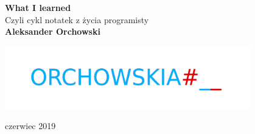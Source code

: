 	\begin{titlepage}
		\begin{center}
			\vspace*{1cm}
{\Huge
			\textbf{What I learned}\\
}			
			\vspace{0.5cm}
{\huge
			Czyli cykl notatek z życia programisty	\\		
}			
			\fontsize{11}{0}
 			\vspace{1.5cm}
{\large
			\textbf{Aleksander Orchowski}
}\\
			\vfill

			\includegraphics[width=0.8\textwidth]{orchowskia}
			\vfill
			
			


			
			\vspace{0.8cm}				

			czerwiec 2019
			
		\end{center}
	\end{titlepage}